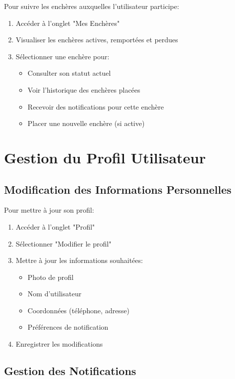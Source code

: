 Pour suivre les enchères auxquelles l'utilisateur participe:

\begin{enumerate}
    \item Accéder à l'onglet "Mes Enchères"
    \item Visualiser les enchères actives, remportées et perdues
    \item Sélectionner une enchère pour:
    \begin{itemize}
        \item Consulter son statut actuel
        \item Voir l'historique des enchères placées
        \item Recevoir des notifications pour cette enchère
        \item Placer une nouvelle enchère (si active)
    \end{itemize}
\end{enumerate}

\section{Gestion du Profil Utilisateur}

\subsection{Modification des Informations Personnelles}

Pour mettre à jour son profil:

\begin{enumerate}
    \item Accéder à l'onglet "Profil"
    \item Sélectionner "Modifier le profil"
    \item Mettre à jour les informations souhaitées:
    \begin{itemize}
        \item Photo de profil
        \item Nom d'utilisateur
        \item Coordonnées (téléphone, adresse)
        \item Préférences de notification
    \end{itemize}
    \item Enregistrer les modifications
\end{enumerate}

\subsection{Gestion des Notifications}

